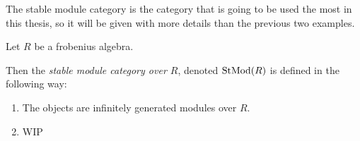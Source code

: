 The stable module category is the category that is going to be used the most in this thesis, so it will be given with more details than the previous two examples.

\begin{definition}
    \label{def:stable_module_category}
    Let \( R \) be a frobenius algebra.

    Then the \emph{stable module category over \( R \)}, denoted \( \operatorname{StMod}(R) \) is defined in the following way:
    \begin{enumerate}
        \item {
            The objects are infinitely generated modules over \( R \).
        }
        \item {
            WIP
        }
    \end{enumerate}
\end{definition}